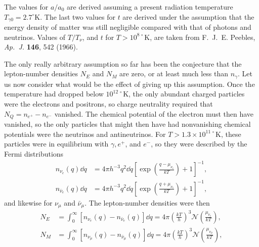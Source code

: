 \begin{table}[htbp]
  \vspace{0.5em}
  \begin{minipage}{0.94\linewidth}
    \footnotesize
    The values for \(a/a_0\) are derived assuming a present radiation
    temperature \(T_{\gamma0}=2.7^\circ\mathrm K\). The last two values for
    \(t\) are derived under the assumption that the energy density of matter
    was still negligible compared with that of photons and neutrinos. Values
    of \(T/T_\nu\), and \(t\) for \(T>10^{8\,\circ}\mathrm K\), are taken
    from F.~J.~E. Peebles, \emph{Ap.\ J.} \textbf{146}, 542 (1966).
  \end{minipage}
\end{table}
\endgroup

The only really arbitrary assumption so far has been the conjecture that the
lepton-number densities \(N_E\) and \(N_M\) are zero, or at least much less
than \(n_\gamma\). Let us now consider what would be the effect of giving up
this assumption. Once the temperature had dropped below
\(10^{12\,\circ}\mathrm K\), the only abundant charged particles were the
electrons and positrons, so charge neutrality required that
\(N_Q=n_{e^+}-n_{e^-}\) vanished. The chemical potential of the electron must
then have vanished, so the only particles that might then have had nonvanishing
chemical potentials were the neutrinos and antineutrinos. For
\(T>1.3\times10^{11\,\circ}\mathrm K\), these particles were in equilibrium
with \(\gamma,e^+\), and \(e^-\), so they were described by the Fermi
distributions
\begin{align}
  n_{\nu_e}(q)\dd q
  &=
  4\pi h^{-3}q^2\dd q
  \left[
    \exp\left(\frac{q-\mu_{\nu_e}}{kT}\right)+1
  \right]^{-1},
  \tag{15.6.50}\label{eq:15.6.50}\\
  n_{\bar\nu_e}(q)\dd q
  &=
  4\pi h^{-3}q^2\dd q
  \left[
    \exp\left(\frac{q+\mu_{\nu_e}}{kT}\right)+1
  \right]^{-1},
  \tag{15.6.51}\label{eq:15.6.51}
\end{align}
and likewise for \(\nu_\mu\) and \(\bar\nu_\mu\). The lepton-number densities
were then
\begin{align}
  N_E
  &=
  \int_0^\infty
  [n_{\nu_e}(q)-n_{\bar\nu_e}(q)]\dd q
  =
  4\pi\left(\frac{kT}{h}\right)^3
  \mathscr N\left(\frac{\mu_{\nu_e}}{kT}\right),
  \tag{15.6.52}\label{eq:15.6.52}\\
  N_M
  &=
  \int_0^\infty
  [n_{\nu_\mu}(q)-n_{\bar\nu_\mu}(q)]\dd q
  =
  4\pi\left(\frac{kT}{h}\right)^3
  \mathscr N\left(\frac{\mu_{\nu_\mu}}{kT}\right),
  \tag{15.6.53}\label{eq:15.6.53}
\end{align}
